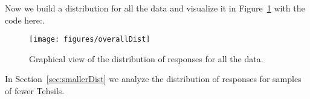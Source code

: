 \documentclass{article}
\begin{document}
Now we build a distribution for all the data and visualize it in Figure~\ref{fig:overallDist} with the code here:.
\begin{knitrout}
\color{fgcolor}\begin{figure}[!hbtp]


{\centering \texttt{[image: figures/overallDist]} 

}

\caption[Graphical view of the distribution of responses for all the data]{Graphical view of the distribution of responses for all the data.\label{fig:overallDist}}
\end{figure}


\end{knitrout}



In Section~\ref{sec:smallerDist} we analyze the distribution of responses for samples of fewer Tehsils.
\end{document}
